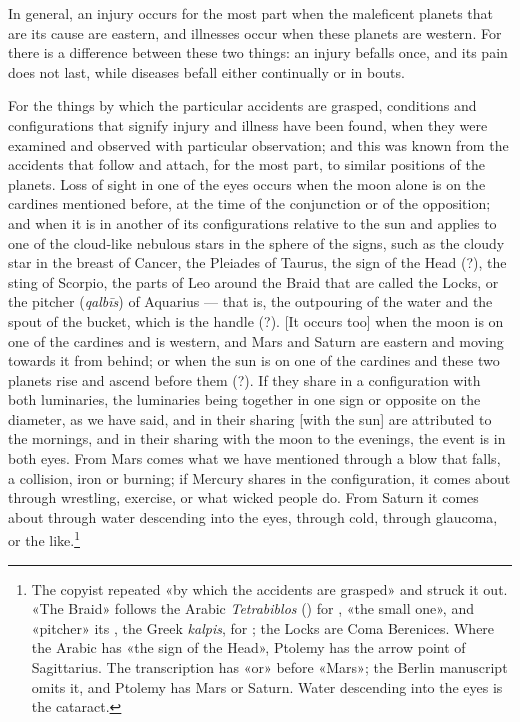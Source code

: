 \documentclass[11pt]{article}
\newcommand{\Fol}[1]{\marginpar{\footnotesize\color{gray}f.\,#1}}
\begin{document}
\par \Fol{53r}In general, an injury occurs for the most part when the maleficent planets that are its cause are eastern, and illnesses occur when these planets are western. For there is a difference between these two things: an injury befalls once, and its pain does not last, while diseases befall either continually or in bouts.\par
\par For the things by which the particular accidents are grasped, conditions and configurations that signify injury and illness have been found, when they were examined and observed with particular observation; and this was known from the accidents that follow and attach, for the most part, to similar positions of the planets. Loss of sight in one of the eyes occurs when the moon alone is on the cardines mentioned before, at the time of the conjunction or of the opposition; and when it is in another of its configurations relative to the sun and applies to one of the cloud-like nebulous stars in the sphere of the signs, such as the cloudy star in the breast of Cancer, the Pleiades of Taurus, the sign of the Head (?), the sting of Scorpio, the parts of Leo around the Braid that are called the Locks, or the pitcher (\emph{qalbīs}) of Aquarius — that is, the outpouring of the water and the spout of the bucket, which is the handle (?). [It occurs too] when the moon is on one of the cardines and is western, and Mars and Saturn are eastern and moving towards it from behind; or when the sun is on one of the cardines and these two planets rise and ascend before them (?). If they share in a configuration with both luminaries, the luminaries being together in one sign or opposite on the diameter, as we have said, and in their sharing [with the sun] are attributed to the mornings, and in their sharing with the moon to the evenings, the event is in both eyes. From Mars comes what we have mentioned through a blow that falls, a collision, iron or burning; if Mercury shares in the configuration, it comes about through wrestling, exercise, or what wicked people do. From Saturn it comes about through water descending into the eyes, through cold, through glaucoma, or the like.\footnote{The copyist repeated «by which the accidents are grasped» and struck it out. «The Braid» follows the Arabic \emph{Tetrabiblos} () for , «the small one», and «pitcher» its , the Greek \emph{kalpis}, for ; the Locks are Coma Berenices. Where the Arabic has «the sign of the Head», Ptolemy has the arrow point of Sagittarius. The transcription has «or» before «Mars»; the Berlin manuscript omits it, and Ptolemy has Mars or Saturn. Water descending into the eyes is the cataract.}\par
\end{document}
